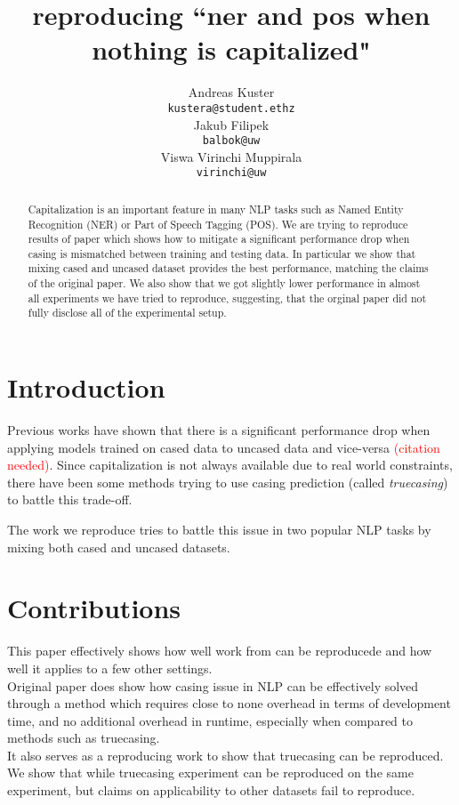 \documentclass[11pt,a4paper]{article}
\title{reproducing ``ner and pos when nothing is capitalized"}
\author{Andreas Kuster \\
    {\tt kustera@student.ethz} \\\And
    Jakub Filipek \\
    {\tt balbok@uw} \\\And
    Viswa Virinchi Muppirala \\
    {\tt virinchi@uw}}
\date{}
\begin{document}
\maketitle
\begin{abstract}
    Capitalization is an important feature in many NLP tasks such as Named Entity Recognition (NER) or Part of Speech Tagging (POS). We are trying to reproduce results of paper which shows how to mitigate a significant performance drop when casing is mismatched between training and testing data. In particular we show that mixing cased and uncased dataset provides the best performance, matching the claims of the original paper. We also show that we got slightly lower performance in almost all experiments we have tried to reproduce, suggesting, that the orginal paper did not fully disclose all of the experimental setup.
\end{abstract}

\section{Introduction}
Previous works have shown that there is a significant performance drop when applying models trained on cased data to uncased data and vice-versa \textcolor{red}{(citation needed)}. Since capitalization is not always available due to real world constraints, there have been some methods trying to use casing prediction (called \textit{truecasing}) to battle this trade-off.

The work we reproduce tries to battle this issue in two popular NLP tasks by mixing both cased and uncased datasets.

\section{Contributions}
This paper effectively shows how well work from \cite{ner-and-pos-original} can be reproducede and how well it applies to a few other settings.\\
Original paper does show how casing issue in NLP can be effectively solved through a method which requires close to none overhead in terms of development time, and no additional overhead in runtime, especially when compared to methods such as truecasing.\\
It also serves as a reproducing work to show that truecasing can be reproduced. We show that while truecasing experiment can be reproduced on the same experiment, but claims on applicability to other datasets fail to reproduce.
\end{document}
